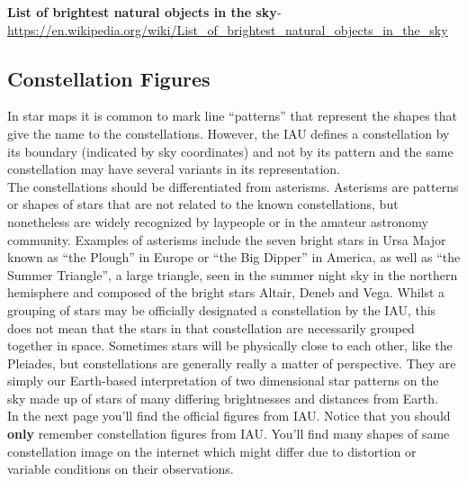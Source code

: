 \documentclass[a4paper,12pt]{extarticle}
\begin{document}
\textbf{List of brightest natural objects in the sky}- \url{https://en.wikipedia.org/wiki/List_of_brightest_natural_objects_in_the_sky}
\subsection{Constellation Figures}

In star maps it is common to mark line “patterns” that represent the shapes that give the name to the constellations. However, the IAU defines a constellation by its boundary (indicated by sky coordinates) and not by its pattern and the same constellation may have several variants in its representation.\\

The constellations should be differentiated from asterisms. Asterisms are patterns or shapes of stars that are not related to the known constellations, but nonetheless are widely recognized by laypeople or in the amateur astronomy community. Examples of asterisms include the seven bright stars in Ursa Major known as “the Plough” in Europe or “the Big Dipper” in America, as well as “the Summer Triangle”, a large triangle, seen in the summer night sky in the northern hemisphere and composed of the bright stars Altair, Deneb and Vega. Whilst a grouping of stars may be officially designated a constellation by the IAU, this does not mean that the stars in that constellation are necessarily grouped together in space. Sometimes stars will be physically close to each other, like the Pleiades, but constellations are generally really a matter of perspective. They are simply our Earth-based interpretation of two dimensional star patterns on the sky made up of stars of many differing brightnesses and distances from Earth.\\

In the next page you'll find the official figures from IAU. Notice that you should \textbf{only} remember constellation figures from IAU. You'll find many shapes of same constellation image on the internet which might differ due to distortion or variable conditions on their observations. 
\end{document}
